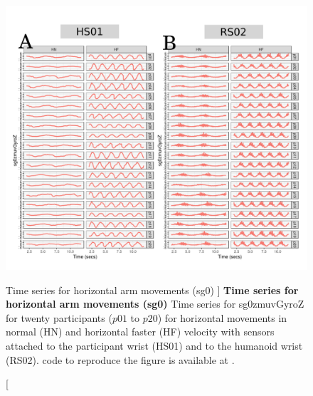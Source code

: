 \begin{figure}
\centering
\includegraphics[width=1.0\textwidth]{ts_H_sg0}
    	\caption
	[Time series for horizontal arm movements (sg0) ]{
	{\bf Time series for horizontal arm movements (sg0)}
		Time series for sg0zmuvGyroZ for twenty participants 
		($p01$ to  $p20$) 
		for horizontal movements in normal (HN) and horizontal faster (HF) 
		velocity with sensors attached to the participant wrist (HS01)
		and to the humanoid wrist (RS02).
	\R code to reproduce the figure is available at 
	.
        }
    \label{fig:aH-sg0}
\end{figure}

